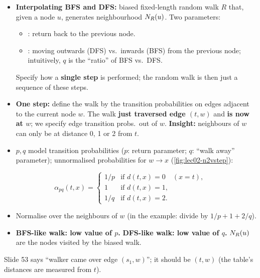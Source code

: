 \begin{itemize}
  \item \textbf{Interpolating BFS and DFS:} biased fixed-length random walk $R$
    that, given a node $u$, generates neighbourhood $N_R(u)$. Two parameters:
    \begin{itemize}
      \item {}: return back to the previous node.
      \item {}: moving outwards (DFS) vs.\ inwards (BFS)
        from the previous node; intuitively, $q$ is the ``ratio'' of BFS vs.\ DFS.
    \end{itemize}
    Specify how a \textbf{single step} is performed; the random walk is then just
    a sequence of these steps.
  \item \textbf{One step:} define the walk by the transition probabilities on
    edges adjacent to the current node $w$. The walk \textbf{just traversed edge
    $(t,w)$} and \textbf{is now at $w$}; we specify edge transition probs.\ out of
    $w$. \textbf{Insight:} neighbours of $w$ can only be at distance 0, 1 or 2
    from $t$.
  \item $p,q$ model transition probabilities ($p$: return parameter; $q$:
    ``walk away'' parameter); unnormalised probabilities for $w\to x$
    (\cref{fig:lec02-n2vstep}):
\end{itemize}
\begin{equation}\label{eq:lec02-alpha}
  \alpha_{pq}(t,x)=
  \begin{cases}
    1/p & \text{if } d(t,x)=0 \quad(x=t),\\
    1   & \text{if } d(t,x)=1,\\
    1/q & \text{if } d(t,x)=2.
  \end{cases}
\end{equation}
\begin{itemize}
  \item Normalise over the neighbours of $w$ (in the example: divide by
    $1/p+1+2/q$).
  \item \textbf{BFS-like walk: low value of $p$.} \textbf{DFS-like walk: low
    value of $q$.} $N_R(u)$ are the nodes visited by the biased walk.
\end{itemize}

\begin{caution}
  Slide 53 says ``walker came over edge $(s_1,w)$''; it should be $(t,w)$ (the
  table's distances are measured from $t$).
\end{caution}

